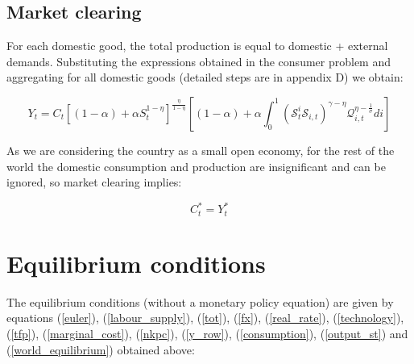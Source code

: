 \documentclass{article}
\begin{document}
\subsection{Market clearing}
For each domestic good, the total production is equal to domestic + external demands. Substituting the expressions obtained in the consumer problem and aggregating for all domestic goods (detailed steps are in appendix D) we obtain:

\begin{equation}
    \label{output_st}
    Y_{t} = C_t \left[(1-\alpha) + \alpha S_t^{1-\eta} \right]^{\frac{\eta}{1-\eta}} \left[(1-\alpha)  +  \alpha \int_0^1 \left(\mathcal S^i_t \mathcal S_{i,t} \right)^{\gamma - \eta} \mathcal Q^{\eta - \frac{1}{\sigma}}_{i,t} di \right] 
\end{equation}



As we are considering the country as a small open economy, for the rest of the world the domestic consumption and production are insignificant and can be ignored, so market clearing implies:

\begin{equation}
    \label{world_equilibrium}
    C_t^* = Y_t^*
\end{equation}

\section{Equilibrium conditions}
The equilibrium conditions (without a monetary policy equation) are given by equations (\ref{euler}), (\ref{labour_supply}), (\ref{tot}), (\ref{fx}), (\ref{real_rate}), (\ref{technology}), (\ref{tfp}), (\ref{marginal_cost}), (\ref{nkpc}), (\ref{y_row}), (\ref{consumption}), (\ref{output_st}) and (\ref{world_equilibrium}) obtained above:
\end{document}
